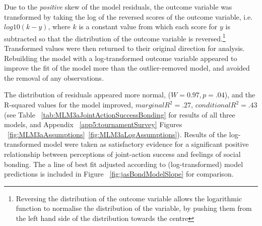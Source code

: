 \begin{landscape}
Due to the \textit{positive} skew of the model residuals, the outcome variable was transformed by taking the log of the reversed scores of the outcome variable, i.e. $log10(k - y)$, where $k$ is a constant value from which each score for $y$ is subtracted so that the distribution of the outcome variable is reversed\citep{Howell2012}.\footnote{Reversing the distribution of the outcome variable allows the logarithmic function to normalise the distribution of the variable, by pushing them from the left hand side of the distribution towards the centre}  Transformed values were then returned to their original direction for analysis\citep{Field2012}.  Rebuilding the model with a log-transformed outcome variable appeared to improve the fit of the model more than the outlier-removed model, and avoided the removal of any observations.

The distribution of residuals appeared more normal, ($W = 0.97, p = .04$), and the R-squared values for the model improved, $marginal R^2 = .27$, $conditional R^2 = .43$ (see Table ~\ref{tab:MLM3aJointActionSuccessBonding} for results of all three models, and Appendix ~\ref{app5:tournamentSurvey} Figures ~\ref{fig:MLM3aAssumptions}\nobreakdash~\ref{fig:MLM3aLogAssumptions}). Results of the log-transformed model were taken as satisfactory evidence for a significant positive relationship between perceptions of joint-action success and feelings of social bonding.  The a line of best fit adjusted according to (log-transformed) model predictions is included in Figure ~\ref{fig:jasBondModelSlope} for comparison.
  



\end{landscape}
